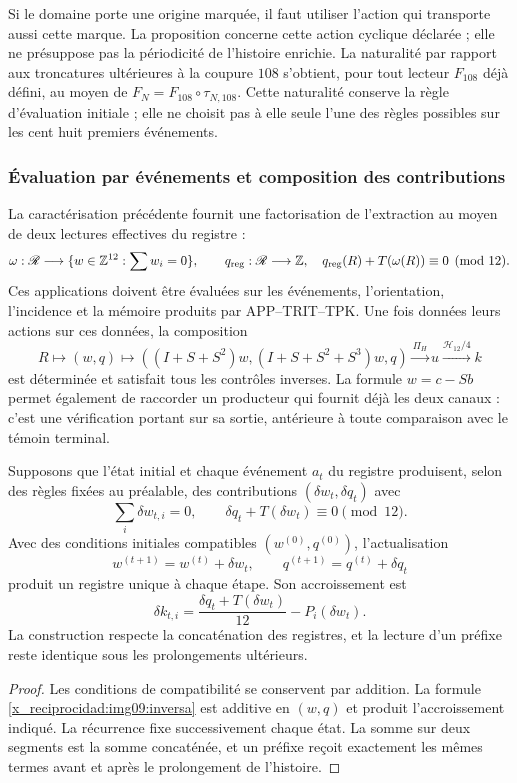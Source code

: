 Si le domaine porte une origine marquée, il faut utiliser l'action qui
transporte aussi cette marque. La proposition concerne cette action
cyclique déclarée ; elle ne présuppose pas la périodicité de l'histoire
enrichie. La naturalité par rapport aux troncatures ultérieures à la coupure
$108$ s'obtient, pour tout lecteur $F_{108}$ déjà défini, au moyen de
$F_N=F_{108}\circ\tau_{N,108}$. Cette naturalité conserve la règle
d'évaluation initiale ; elle ne choisit pas à elle seule l'une des règles possibles
sur les cent huit premiers événements.

\subsubsection{Évaluation par événements et composition des contributions}

La caractérisation précédente fournit une factorisation de l'extraction au moyen de deux
lectures effectives du registre :
\begin{equation}
 \omega:\mathscr R\longrightarrow
 \{w\in\mathbb Z^{12}:\sum w_i=0\},\qquad
 q_{\rm reg}:\mathscr R\longrightarrow\mathbb Z,
 \quad q_{\rm reg}(R)+T(\omega(R))\equiv0\pmod {12}.
 \label{x_reciprocidad:img09:contrato-productor}
\end{equation}
Ces applications doivent être évaluées sur les événements, l'orientation,
l'incidence et la mémoire produits par APP--TRIT--TPK. Une fois données leurs
actions sur ces données, la composition
\[
 R\longmapsto(w,q)\longmapsto
 ((I+S+S^2)w,(I+S+S^2+S^3)w,q)
 \xrightarrow{\Pi_H}u\xrightarrow{\mathcal H_{12}/4}k
\]
est déterminée et satisfait tous les contrôles inverses. La formule
$w=c-Sb$ permet également de raccorder un producteur qui fournit déjà les deux
canaux : c'est une vérification portant sur sa sortie, antérieure à toute comparaison
avec le témoin terminal.

\begin{proposition}
\label{x_reciprocidad:img09:acumulacion}
Supposons que l'état initial et chaque événement $a_t$ du registre
produisent, selon des règles fixées au préalable, des contributions
$(\delta w_t,\delta q_t)$ avec
\[
 \sum_i\delta w_{t,i}=0,\qquad
 \delta q_t+T(\delta w_t)\equiv0\pmod {12}.
\]
Avec des conditions initiales compatibles $(w^{(0)},q^{(0)})$,
l'actualisation
\[
 w^{(t+1)}=w^{(t)}+\delta w_t,\qquad
 q^{(t+1)}=q^{(t)}+\delta q_t
\]
produit un registre unique à chaque étape. Son accroissement est
\[
 \delta k_{t,i}=
 \frac{\delta q_t+T(\delta w_t)}{12}-P_i(\delta w_t).
\]
La construction respecte la concaténation des registres, et la lecture
d'un préfixe reste identique sous les prolongements ultérieurs.
\end{proposition}
\begin{proof}
Les conditions de compatibilité se conservent par addition. La formule
\eqref{x_reciprocidad:img09:inversa} est additive en $(w,q)$ et produit
l'accroissement indiqué. La récurrence fixe successivement chaque état.
La somme sur deux segments est la somme concaténée, et un préfixe reçoit
exactement les mêmes termes avant et après le prolongement de l'histoire.
\end{proof}

